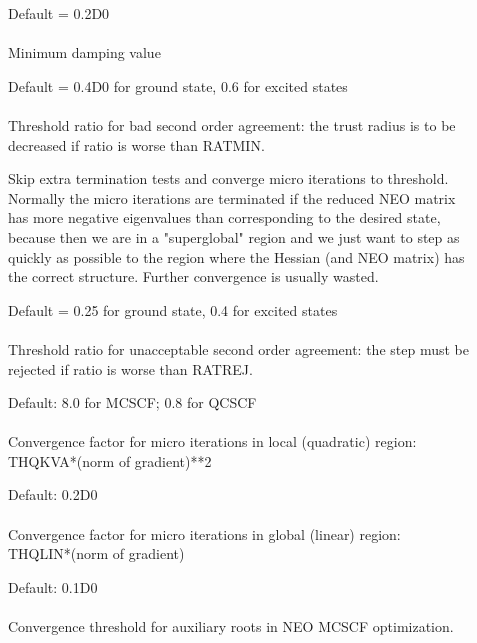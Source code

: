 \begin{description}
\item[]
  Default = 0.2D0\\
   \\
  Minimum damping value

\item[]
  Default = 0.4D0 for ground state, 0.6 for excited states\\
   \\
  Threshold ratio for bad second order agreement: the trust radius is
  to be decreased if ratio is worse than RATMIN.

\item[]
  Skip extra termination tests and converge micro iterations to
  threshold.   Normally the micro iterations are terminated if the
  reduced NEO matrix has more negative eigenvalues than corresponding
  to the desired state, because then we are in a "superglobal" region
  and we just want to step as quickly as possible to the region where
  the Hessian (and NEO matrix) has the correct structure.  Further
  convergence is usually wasted.

\item[]
  Default = 0.25 for ground state, 0.4 for excited states\\
   \\
  Threshold ratio for unacceptable second order agreement: the step
  must be rejected if ratio is worse than RATREJ.

\item[]
  Default: 8.0 for MCSCF; 0.8 for QCSCF\\
   \\
  Convergence factor for micro iterations in local (quadratic) region:
  THQKVA*(norm of gradient)**2

\item[]
  Default: 0.2D0\\
   \\
  Convergence factor for micro iterations in global (linear) region: \\
  THQLIN*(norm of gradient)

\item[]
  Default: 0.1D0\\
   \\
  Convergence threshold for auxiliary roots in NEO MCSCF optimization.


\end{description}
